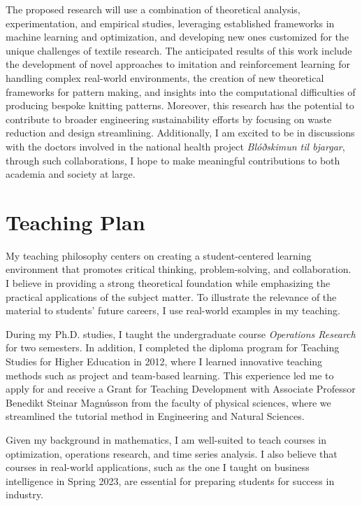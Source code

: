 \documentclass[]{cv} %
\begin{document}

The proposed research will use a combination of theoretical analysis, experimentation, and empirical studies, leveraging established frameworks in machine learning and optimization, and developing new ones customized for the unique challenges of textile research. The anticipated results of this work include the development of novel approaches to imitation and reinforcement learning for handling complex real-world environments, the creation of new theoretical frameworks for pattern making, and insights into the computational difficulties of producing bespoke knitting patterns. Moreover, this research has the potential to contribute to broader engineering sustainability efforts by focusing on waste reduction and design streamlining. Additionally, I am excited to be in discussions with the doctors involved in the national health project \textit{Blóðskimun til bjargar}, through such collaborations, I hope to make meaningful contributions to both academia and society at large.


\section{Teaching Plan}
My teaching philosophy centers on creating a student-centered learning environment that promotes critical thinking, problem-solving, and collaboration. I believe in providing a strong theoretical foundation while emphasizing the practical applications of the subject matter. To illustrate the relevance of the material to students' future careers, I use real-world examples in my teaching.

During my Ph.D. studies, I taught the undergraduate course \textit{Operations Research} for two semesters. In addition, I completed the diploma program for Teaching Studies for Higher Education in 2012, where I learned innovative teaching methods such as project and team-based learning. This experience led me to apply for and receive a Grant for Teaching Development with Associate Professor Benedikt Steinar Magnússon from the faculty of physical sciences, where we streamlined the tutorial method in Engineering and Natural Sciences.

Given my background in mathematics, I am well-suited to teach courses in optimization, operations research, and time series analysis. I also believe that courses in real-world applications, such as the one I taught on business intelligence in Spring 2023, are essential for preparing students for success in industry.
\end{document}
